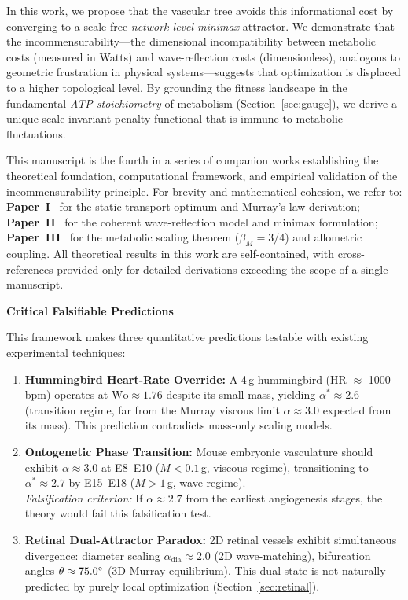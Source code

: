 In this work, we propose that the vascular tree avoids this informational cost
by converging to a scale-free \emph{network-level minimax} attractor. We
demonstrate that the incommensurability---the dimensional incompatibility
between metabolic costs (measured in Watts) and wave-reflection costs
(dimensionless), analogous to geometric frustration in physical
systems---suggests that optimization is displaced to a higher topological
level. By grounding the fitness landscape in the fundamental \emph{ATP
stoichiometry} of metabolism (Section~\ref{sec:gauge}), we derive a unique
scale-invariant penalty functional that is immune to metabolic fluctuations.

\begin{remark}
This manuscript is the fourth in a series of companion works establishing the
theoretical foundation, computational framework, and empirical validation of the
incommensurability principle. For brevity and mathematical cohesion, we refer
to: \textbf{Paper~I}~\cite{paperI} for the static transport optimum and Murray's
law derivation; \textbf{Paper~II}~\cite{paperII} for the coherent
wave-reflection model and minimax formulation;
\textbf{Paper~III}~\cite{paperIII} for the metabolic scaling theorem
($\beta_M = 3/4$) and allometric coupling. All theoretical results in this
work are self-contained, with cross-references provided only for detailed
derivations exceeding the scope of a single manuscript.
\end{remark}

\vspace{1em} \noindent\textbf{Critical Falsifiable Predictions}

This framework makes three quantitative predictions testable with existing
experimental techniques:
\begin{enumerate}[label=\textbf{\arabic*.}, leftmargin=*]
\item
\textbf{Hummingbird Heart-Rate Override:} A 4\,g hummingbird (HR $\approx$
1000\,bpm) operates at $\mathrm{Wo} \approx 1.76$ despite its small mass,
yielding $\alpha^* \approx 2.6$ (transition regime, far from the Murray viscous
limit $\alpha \approx 3.0$ expected from its mass). This prediction contradicts
mass-only scaling models.
\item
\textbf{Ontogenetic Phase Transition:} Mouse embryonic vasculature should
exhibit $\alpha \approx 3.0$ at E8--E10 ($M < 0.1\,$g, viscous regime),
transitioning to $\alpha^* \approx 2.7$ by E15--E18 ($M > 1\,$g, wave regime).
\\
\emph{Falsification criterion:} If $\alpha \approx 2.7$ from the earliest
angiogenesis stages, the theory would fail this falsification test.
\item
\textbf{Retinal Dual-Attractor Paradox:} 2D retinal vessels exhibit simultaneous
divergence: diameter scaling $\alpha_{\text{dia}} \approx 2.0$ (2D
wave-matching), bifurcation angles $\theta \approx
75.0^\circ$ (3D Murray equilibrium). This dual
state is not naturally predicted by purely local optimization
(Section~\ref{sec:retinal}).
\end{enumerate}
\vspace{1em}

